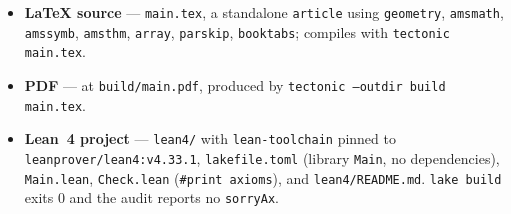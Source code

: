 \documentclass[11pt]{article}
\theoremstyle{definition}
\theoremstyle{remark}
\begin{document}
\begin{itemize}
\item \textbf{LaTeX source} --- \texttt{main.tex}, a standalone \texttt{article}
  using \texttt{geometry}, \texttt{amsmath}, \texttt{amssymb}, \texttt{amsthm},
  \texttt{array}, \texttt{parskip}, \texttt{booktabs}; compiles with
  \texttt{tectonic main.tex}.
\item \textbf{PDF} --- at \texttt{build/main.pdf}, produced by
  \texttt{tectonic --outdir build main.tex}.
\item \textbf{Lean~4 project} --- \texttt{lean4/} with \texttt{lean-toolchain}
  pinned to \texttt{leanprover/lean4:v4.33.1}, \texttt{lakefile.toml}
  (library \texttt{Main}, no dependencies), \texttt{Main.lean},
  \texttt{Check.lean} (\texttt{\#print axioms}), and \texttt{lean4/README.md}.
  \texttt{lake build} exits $0$ and the audit reports no \texttt{sorryAx}.
\end{itemize}
\end{document}

